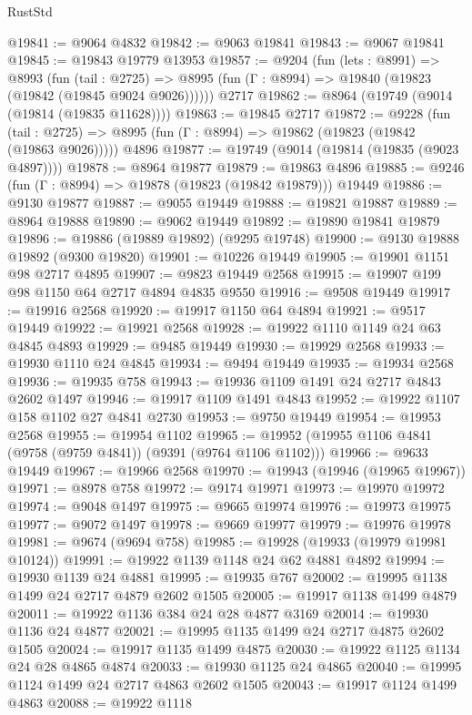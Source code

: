 \begin{lexlean}{RustStd}
\begin{coremodule}
@19841 := @9064 @4832
@19842 := @9063 @19841
@19843 := @9067 @19841
@19845 := @19843 @19779 @13953
@19857 := @9204
    (fun (lets : @8991) =>
    @8993
      (fun (tail : @2725) =>
      @8995 (fun (Γ : @8994) => @19840 (@19823 (@19842 (@19845 @9024 @9026))))))
    @2717
@19862 := @8964 (@19749 (@9014 (@19814 (@19835 @11628))))
@19863 := @19845 @2717
@19872 := @9228
    (fun (tail : @2725) => @8995 (fun (Γ : @8994) => @19862 (@19823 (@19842 (@19863 @9026)))))
    @4896
@19877 := @19749 (@9014 (@19814 (@19835 (@9023 @4897))))
@19878 := @8964 @19877
@19879 := @19863 @4896
@19885 := @9246 (fun (Γ : @8994) => @19878 (@19823 (@19842 @19879))) @19449
@19886 := @9130 @19877
@19887 := @9055 @19449
@19888 := @19821 @19887
@19889 := @8964 @19888
@19890 := @9062 @19449
@19892 := @19890 @19841 @19879
@19896 := @19886 (@19889 @19892) (@9295 @19748)
@19900 := @9130 @19888 @19892 (@9300 @19820)
@19901 := @10226 @19449
@19905 := @19901 @1151 @98 @2717 @4895
@19907 := @9823 @19449 @2568
@19915 := @19907 @199 @98 @1150 @64 @2717 @4894 @4835 @9550
@19916 := @9508 @19449
@19917 := @19916 @2568
@19920 := @19917 @1150 @64 @4894
@19921 := @9517 @19449
@19922 := @19921 @2568
@19928 := @19922 @1110 @1149 @24 @63 @4845 @4893
@19929 := @9485 @19449
@19930 := @19929 @2568
@19933 := @19930 @1110 @24 @4845
@19934 := @9494 @19449
@19935 := @19934 @2568
@19936 := @19935 @758
@19943 := @19936 @1109 @1491 @24 @2717 @4843 @2602 @1497
@19946 := @19917 @1109 @1491 @4843
@19952 := @19922 @1107 @158 @1102 @27 @4841 @2730
@19953 := @9750 @19449
@19954 := @19953 @2568
@19955 := @19954 @1102
@19965 := @19952 (@19955 @1106 @4841 (@9758 (@9759 @4841)) (@9391 (@9764 @1106 @1102)))
@19966 := @9633 @19449
@19967 := @19966 @2568
@19970 := @19943 (@19946 (@19965 @19967))
@19971 := @8978 @758
@19972 := @9174 @19971
@19973 := @19970 @19972
@19974 := @9048 @1497
@19975 := @9665 @19974
@19976 := @19973 @19975
@19977 := @9072 @1497
@19978 := @9669 @19977
@19979 := @19976 @19978
@19981 := @9674 (@9694 @758)
@19985 := @19928 (@19933 (@19979 @19981 @10124))
@19991 := @19922 @1139 @1148 @24 @62 @4881 @4892
@19994 := @19930 @1139 @24 @4881
@19995 := @19935 @767
@20002 := @19995 @1138 @1499 @24 @2717 @4879 @2602 @1505
@20005 := @19917 @1138 @1499 @4879
@20011 := @19922 @1136 @384 @24 @28 @4877 @3169
@20014 := @19930 @1136 @24 @4877
@20021 := @19995 @1135 @1499 @24 @2717 @4875 @2602 @1505
@20024 := @19917 @1135 @1499 @4875
@20030 := @19922 @1125 @1134 @24 @28 @4865 @4874
@20033 := @19930 @1125 @24 @4865
@20040 := @19995 @1124 @1499 @24 @2717 @4863 @2602 @1505
@20043 := @19917 @1124 @1499 @4863
@20088 := @19922
    @1118

\end{coremodule}
\end{lexlean}

